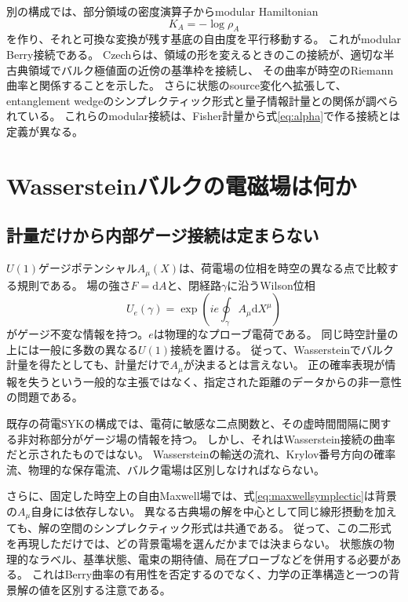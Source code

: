 \documentclass[a4paper,11pt]{ltjsarticle}
\numberwithin{equation}{section}
\newcommand{\dd}{\mathrm d}
\begin{document}
別の構成では、部分領域の密度演算子からmodular Hamiltonian
\begin{equation}
 K_A=-\log\rho_A
 \label{eq:modular}
\end{equation}
を作り、それと可換な変換が残す基底の自由度を平行移動する。
これがmodular Berry接続である\cite{Modular}。
Czechらは、領域の形を変えるときのこの接続が、適切な半古典領域でバルク極値面の近傍の基準枠を接続し、
その曲率が時空のRiemann曲率と関係することを示した\cite{Sewing}。
さらに状態のsource変化へ拡張して、entanglement wedgeのシンプレクティック形式と量子情報計量との関係が調べられている\cite{Changing}。
これらのmodular接続は、Fisher計量から式\eqref{eq:alpha}で作る接続とは定義が異なる。

\section{Wassersteinバルクの電磁場は何か}
\subsection{計量だけから内部ゲージ接続は定まらない}
$U(1)$ゲージポテンシャル$A_\mu(X)$は、荷電場の位相を時空の異なる点で比較する規則である。
場の強さ$F=\dd A$と、閉経路$\gamma$に沿うWilson位相
\begin{equation}
 U_e(\gamma)=\exp\left(i e\oint_\gamma A_\mu\dd X^\mu\right)
 \label{eq:wilson}
\end{equation}
がゲージ不変な情報を持つ。$e$は物理的なプローブ電荷である。
同じ時空計量の上には一般に多数の異なる$U(1)$接続を置ける。
従って、Wassersteinでバルク計量を得たとしても、計量だけで$A_\mu$が決まるとは言えない。
正の確率表現が情報を失うという一般的な主張ではなく、指定された距離のデータからの非一意性の問題である。

既存の荷電SYKの構成では、電荷に敏感な二点関数と、その虚時間間隔に関する非対称部分がゲージ場の情報を持つ\cite{BNR,GST}。
しかし、それはWasserstein接続の曲率だと示されたものではない。
Wassersteinの輸送の流れ、Krylov番号方向の確率流、物理的な保存電流、バルク電場は区別しなければならない。

さらに、固定した時空上の自由Maxwell場では、式\eqref{eq:maxwellsymplectic}は背景の$A_\mu$自身には依存しない。
異なる古典場の解を中心として同じ線形摂動を加えても、解の空間のシンプレクティック形式は共通である。
従って、この二形式を再現しただけでは、どの背景電場を選んだかまでは決まらない。
状態族の物理的なラベル、基準状態、電束の期待値、局在プローブなどを併用する必要がある。
これはBerry曲率の有用性を否定するのでなく、力学の正準構造と一つの背景解の値を区別する注意である。
\end{document}
